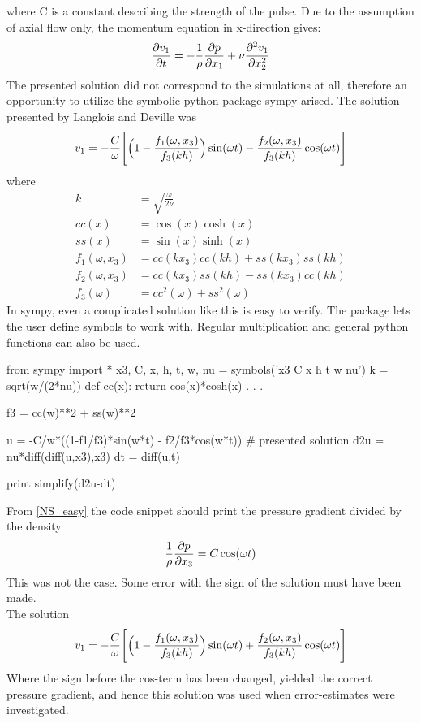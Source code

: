 where C is a constant describing the strength of the pulse. Due to the assumption of axial flow only, the momentum equation in x-direction gives:
\begin{align}
\frac{\partial v_1}{\partial t} = -\frac{1}{\rho}\frac{\partial p}{\partial x_1} + \nu \frac{\partial ^2v_1}{\partial x_2^2} \label{NS_easy}
\end{align}
The presented solution did not correspond to the simulations at all, therefore an opportunity to utilize the symbolic python package sympy arised. The solution presented by Langlois and Deville was
\begin{align}
v_1 = -\frac{C}{\omega}\Bigg{[}\Big{(}1 - \frac{f_1(\omega,x_3)}{f_3(kh)}\Big{)}\sin(\omega t) - \frac{f_2(\omega,x_3)}{f_3(kh)}\cos(\omega t)\Bigg{]}
\end{align}
where
\begin{align}
k & = \sqrt{\frac{\omega}{2\nu}} \\
cc(x) & = \cos(x)\cosh(x) \\
ss(x) & = \sin(x)\sinh(x) \\
f_1(\omega,x_3) & = cc(kx_3)cc(kh) + ss(kx_3)ss(kh) \\
f_2(\omega,x_3) & = cc(kx_3)ss(kh) - ss(kx_3)cc(kh) \\
f_3(\omega) & = cc^2(\omega) + ss^2(\omega)
\end{align}
In sympy, even a complicated solution like this is easy to verify. The package lets the user define symbols to work with. Regular multiplication and general python functions can also be used. 
\begin{cverbatim}
from sympy import *
x3, C, x, h, t, w, nu = symbols('x3 C x h t w nu')
k = sqrt(w/(2*nu))
def cc(x):
	return cos(x)*cosh(x)
.
.
.

f3 = cc(w)**2 + ss(w)**2 

u = -C/w*((1-f1/f3)*sin(w*t) - f2/f3*cos(w*t))   # presented solution
d2u = nu*diff(diff(u,x3),x3)
dt = diff(u,t)

print simplify(d2u-dt)
\end{cverbatim}

From \eqref{NS_easy} the code snippet should print the pressure gradient divided by the density
\begin{align}
\frac{1}{\rho}\frac{\partial p}{\partial x_3} = C\cos(\omega t)
\end{align}
This was not the case. Some error with the sign of the solution must have been made. 
\\
The solution
\begin{align}
v_1 = -\frac{C}{\omega}\Bigg{[}\Big{(}1 - \frac{f_1(\omega,x_3)}{f_3(kh)}\Big{)}\sin(\omega t) + \frac{f_2(\omega,x_3)}{f_3(kh)}\cos(\omega t)\Bigg{]} \label{Womersley}
\end{align}
Where the sign before the cos-term has been changed, yielded the correct pressure gradient, and hence this solution was used when error-estimates were investigated. 


